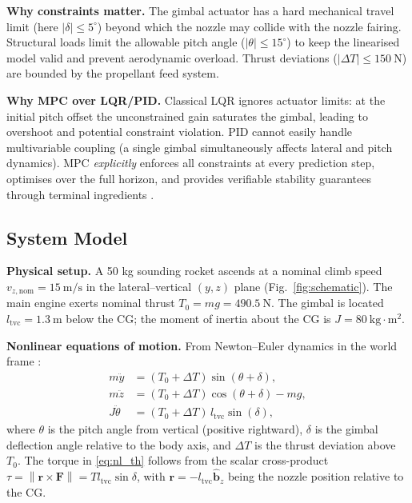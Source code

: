 \documentclass[11pt,a4paper]{article}
\newcommand{\vect}[1]{\bm{#1}}
\newcommand{\norm}[1]{\left\lVert #1 \right\rVert}
\begin{document}
\textbf{Why constraints matter.}
The gimbal actuator has a hard mechanical travel limit (here $|\delta| \leq 5^{\circ}$)
beyond which the nozzle may collide with the nozzle fairing.
Structural loads limit the allowable pitch angle ($|\theta| \leq 15^{\circ}$) to keep the
linearised model valid and prevent aerodynamic overload.  Thrust deviations
($|\Delta T| \leq 150\ \text{N}$) are bounded by the propellant feed system.

\textbf{Why MPC over LQR/PID.}
Classical LQR ignores actuator limits: at the initial pitch offset the unconstrained
gain saturates the gimbal, leading to overshoot and potential constraint violation.
PID cannot easily handle multivariable coupling (a single gimbal simultaneously
affects lateral and pitch dynamics).  MPC \emph{explicitly} enforces all constraints
at every prediction step, optimises over the full horizon, and provides verifiable
stability guarantees through terminal ingredients \cite{Mayne2000, RawlingsMayne2017}.

\subsection{System Model}

\textbf{Physical setup.}
A 50 kg sounding rocket ascends at a nominal climb speed $v_{z,\mathrm{nom}} =
15\ \mathrm{m/s}$ in the lateral--vertical $(y,z)$ plane (Fig.~\ref{fig:schematic}).
The main engine exerts nominal thrust $T_0 = mg = 490.5\ \mathrm{N}$.  The gimbal
is located $l_{\mathrm{tvc}} = 1.3\ \mathrm{m}$ below the CG; the moment of
inertia about the CG is $J = 80\ \mathrm{kg\cdot m^2}$.

\textbf{Nonlinear equations of motion.}  From Newton--Euler dynamics in the world
frame \cite{Wie1998}:
\begin{align}
  m\ddot{y}        &= (T_0+\Delta T)\sin(\theta+\delta),  \label{eq:nl_y} \\
  m\ddot{z}        &= (T_0+\Delta T)\cos(\theta+\delta) - mg, \label{eq:nl_z} \\
  J\ddot{\theta}   &= (T_0+\Delta T)\,l_{\mathrm{tvc}}\sin(\delta), \label{eq:nl_th}
\end{align}
where $\theta$ is the pitch angle from vertical (positive rightward), $\delta$ is
the gimbal deflection angle relative to the body axis, and $\Delta T$ is the thrust
deviation above $T_0$.  The torque in \eqref{eq:nl_th} follows from the scalar
cross-product $\tau = \norm{\vect{r} \times \vect{F}}= T l_{\mathrm{tvc}}\sin\delta$,
with $\vect{r} = -l_{\mathrm{tvc}}\hat{\vect{b}}_z$ being the nozzle position
relative to the CG.
\end{document}
